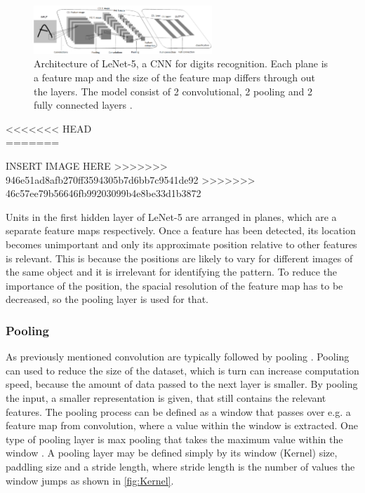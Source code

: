 \begin{figure} [H]
\centering
\includegraphics[width=0.6\textwidth]{figures/LeNet5}
\caption{Architecture of LeNet-5, a CNN for digits recognition. Each plane is a feature map and the size of the feature map differs through out the layers. The model consist of 2 convolutional, 2 pooling and 2 fully connected layers \citep{LeCun1998}.}
\label{fig:LeNet5}  
\end{figure}
<<<<<<< HEAD
\\
=======

\noindent

\noindent
INSERT IMAGE HERE
>>>>>>> 946e51ad8afb270ff3594305b7d6bb7c9541de92
>>>>>>> 46c57ee79b56646fb99203099b4e8be33d1b3872


Units in the first hidden layer of LeNet-5 are arranged in planes, which are a separate feature maps respectively. Once a feature has been detected, its location becomes unimportant and only its approximate position relative to other features is relevant. This is because the positions are likely to vary for different images of the same object and it is irrelevant for identifying the pattern. To reduce the importance of the position, the spacial resolution of the feature map has to be decreased, so the pooling layer is used for that.\citep{LeCun1998}



\subsubsection{Pooling}
As previously mentioned convolution are typically followed by pooling \citep{LeCun2015, Goodfellow0216}. 
Pooling can used to reduce the size of the dataset, which is turn can increase computation speed, because the amount of data passed to the next layer is smaller. By pooling the input, a smaller representation is given, that still contains the relevant features.\citep{Goodfellow2016,LeCun1998}     
The pooling process can be defined as a window that passes over e.g. a feature map from convolution, where a value within the window is extracted. One type of pooling layer is max pooling that takes the maximum value within the window \citep{Goodfellow2016,Dumoulin2016}. A pooling layer may be defined simply by its window (Kernel) size, paddling size and a stride length, where stride length is the number of values the window jumps as shown in \autoref{fig:Kernel}. \citep{Dumoulin2016}

